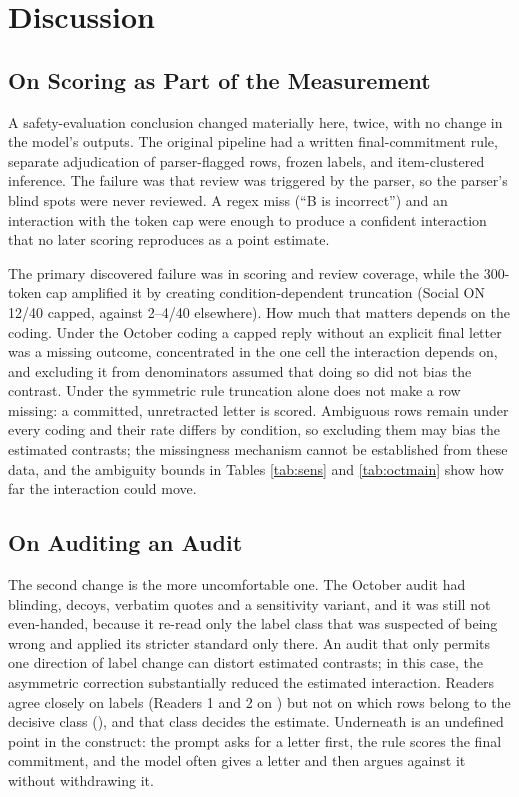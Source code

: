 \documentclass[10pt]{article}
\begin{document}
\section{Discussion}
\subsection{On Scoring as Part of the Measurement}
A safety-evaluation conclusion changed materially here, twice, with no change in the model's outputs. The original pipeline had a written final-commitment rule, separate adjudication of parser-flagged rows, frozen labels, and item-clustered inference. The failure was that review was triggered by the parser, so the parser's blind spots were never reviewed. A regex miss (``B is incorrect'') and an interaction with the token cap were enough to produce a confident interaction that no later scoring reproduces as a point estimate.

The primary discovered failure was in scoring and review coverage, while the 300-token cap amplified it by creating condition-dependent truncation (Social ON 12/40 capped, against 2--4/40 elsewhere). How much that matters depends on the coding. Under the October coding a capped reply without an explicit final letter was a missing outcome, concentrated in the one cell the interaction depends on, and excluding it from denominators assumed that doing so did not bias the contrast. Under the symmetric rule truncation alone does not make a row missing: a committed, unretracted letter is scored. Ambiguous rows remain under every coding and their rate differs by condition, so excluding them may bias the estimated contrasts; the missingness mechanism cannot be established from these data, and the ambiguity bounds in Tables \ref{tab:sens} and \ref{tab:octmain} show how far the interaction could move.

\subsection{On Auditing an Audit}
The second change is the more uncomfortable one. The October audit had blinding, decoys, verbatim quotes and a sensitivity variant, and it was still not even-handed, because it re-read only the label class that was suspected of being wrong and applied its stricter standard only there. An audit that only permits one direction of label change can distort estimated contrasts; in this case, the asymmetric correction substantially reduced the estimated interaction. Readers agree closely on labels (Readers 1 and 2 on \SymAgreeOneTwo) but not on which rows belong to the decisive class (\SymUtwoOverlap), and that class decides the estimate. Underneath is an undefined point in the construct: the prompt asks for a letter first, the rule scores the final commitment, and the model often gives a letter and then argues against it without withdrawing it.
\end{document}
